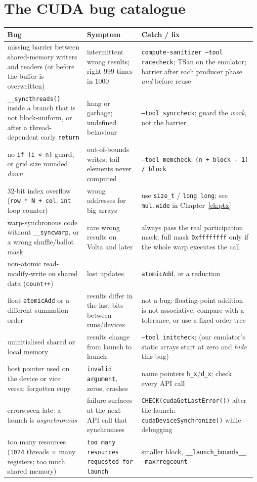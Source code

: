 \documentclass[10pt,a4paper,openany,oneside]{report}
\newcommand{\prio}[1]{\texorpdfstring{\ifcase#1\or{\color{gold}\ding{72}}\or{\color{gold}\ding{72}\ding{72}}\or{\color{gold}\ding{72}\ding{72}\ding{72}}\fi}{}}
\begin{document}
\section{The CUDA bug catalogue \prio{2}}
\begin{center}\small
\begin{xltabular}{\textwidth}{@{}L{4.1cm}L{3.9cm}Y@{}}
\toprule
\textbf{Bug} & \textbf{Symptom} & \textbf{Catch / fix}\\
\midrule\endhead
missing barrier between shared-memory writers and readers (or before the buffer is overwritten) & intermittent wrong results; right 999 times in 1000 & \texttt{compute-sanitizer --tool racecheck}; TSan on the emulator; barrier after each producer phase \emph{and} before reuse\\
\texttt{\_\_syncthreads()} inside a branch that is not block-uniform, or after a thread-dependent early \texttt{return} & hang or garbage; undefined behaviour & \texttt{--tool synccheck}; guard the \emph{work}, not the barrier\\
no \texttt{if (i < n)} guard, or grid size rounded \emph{down} & out-of-bounds writes; tail elements never computed & \texttt{--tool memcheck}; \texttt{(n + block - 1) / block}\\
32-bit index overflow (\texttt{row * N + col}, \texttt{int} loop counter) & wrong addresses for big arrays & use \texttt{size\_t} / \texttt{long long}; see \texttt{mul.wide} in Chapter~\ref{ch:ptx}\\
warp-synchronous code without \texttt{\_\_syncwarp}, or a wrong shuffle/ballot mask & rare wrong results on Volta and later & always pass the real participation mask; full mask \texttt{0xffffffff} only if the whole warp executes the call\\
non-atomic read-modify-write on shared data (\texttt{count++}) & lost updates & \texttt{atomicAdd}, or a reduction\\
float \texttt{atomicAdd} or a different summation order & results differ in the last bits between runs/devices & not a bug: floating-point addition is not associative; compare with a tolerance, or use a fixed-order tree\\
uninitialised shared or local memory & results change from launch to launch & \texttt{--tool initcheck}; (our emulator's static arrays start at zero and \emph{hide} this bug)\\
host pointer used on the device or vice versa; forgotten copy & \texttt{invalid argument}, zeros, crashes & name pointers \texttt{h\_x}/\texttt{d\_x}; check every API call\\
errors seen late: a launch is \emph{asynchronous} & failure surfaces at the next API call that synchronises & \texttt{CHECK(cudaGetLastError())} after the launch; \texttt{cudaDeviceSynchronize()} while debugging\\
too many resources (\texttt{1024} threads $\times$ many registers; too much shared memory) & \texttt{too many resources requested for launch} & smaller block, \texttt{\_\_launch\_bounds\_\_}, \texttt{--maxrregcount}\\
\bottomrule
\end{xltabular}
\end{center}
\end{document}
